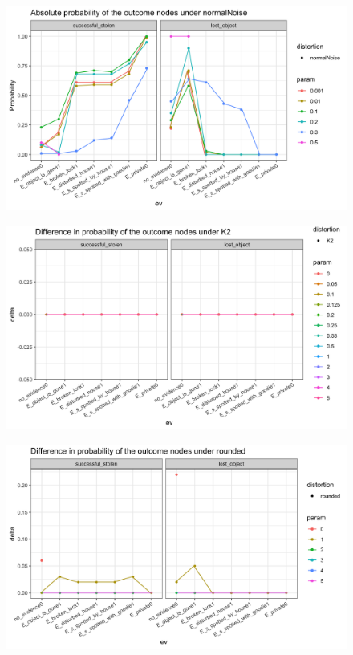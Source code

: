 \documentclass[11pt]{amsart}
\begin{document}
\begin{figure}[htbp]
\centering
\begin{center}
\includegraphics[scale=0.17]{images/normalNoiseabsolute.png}
\label{default}
\end{center}
\end{figure}



\begin{figure}[htbp]
\begin{center}
\includegraphics[scale=0.17]{images/K2delta.png}
\label{default}
\end{center}
\end{figure}

\begin{figure}[htbp]
\begin{center}
\includegraphics[scale=0.17]{images/roundeddelta.png}
\label{default}
\end{center}
\end{figure}
\end{document}
